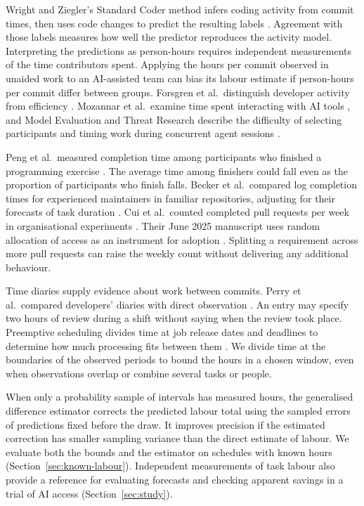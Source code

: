\documentclass[11pt,a4paper]{amsart}
\begin{document}
Wright and Ziegler's Standard Coder method infers coding activity from commit times, then uses code changes to predict the resulting labels \cite{wright2019}. Agreement with those labels measures how well the predictor reproduces the activity model. Interpreting the predictions as person-hours requires independent measurements of the time contributors spent. Applying the hours per commit observed in unaided work to an AI-assisted team can bias its labour estimate if person-hours per commit differ between groups. Forsgren et al.\ distinguish developer activity from efficiency \cite{forsgren2021}. Mozannar et al.\ examine time spent interacting with AI tools \cite{mozannar2024}, and Model Evaluation and Threat Research describe the difficulty of selecting participants and timing work during concurrent agent sessions \cite{metr2026}.

Peng et al.\ measured completion time among participants who finished a programming exercise \cite{peng2023}. The average time among finishers could fall even as the proportion of participants who finish falls. Becker et al.\ compared log completion times for experienced maintainers in familiar repositories, adjusting for their forecasts of task duration \cite{becker2025}. Cui et al.\ counted completed pull requests per week in organisational experiments \cite{cui2026}. Their June 2025 manuscript uses random allocation of access as an instrument for adoption \cite[Section 4.1 and Table 3]{cui2025manuscript}. Splitting a requirement across more pull requests can raise the weekly count without delivering any additional behaviour.

Time diaries supply evidence about work between commits. Perry et al.\ compared developers' diaries with direct observation \cite{perry1994}. An entry may specify two hours of review during a shift without saying when the review took place. Preemptive scheduling divides time at job release dates and deadlines to determine how much processing fits between them \cite{bertsimas2009flows}. We divide time at the boundaries of the observed periods to bound the hours in a chosen window, even when observations overlap or combine several tasks or people.

When only a probability sample of intervals has measured hours, the generalised difference estimator \cite{cassel1976} corrects the predicted labour total using the sampled errors of predictions fixed before the draw. It improves precision if the estimated correction has smaller sampling variance than the direct estimate of labour. We evaluate both the bounds and the estimator on schedules with known hours (Section~\ref{sec:known-labour}). Independent measurements of task labour also provide a reference for evaluating forecasts and checking apparent savings in a trial of AI access (Section~\ref{sec:study}).
\end{document}

